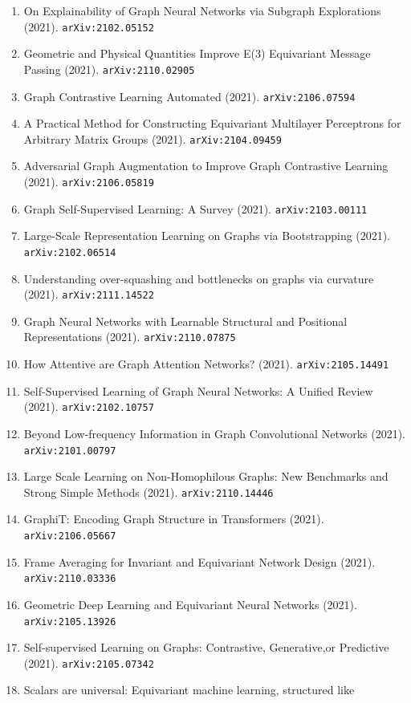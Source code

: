 \documentclass[11pt]{article}
\begin{document}
\begin{enumerate}
  \item On Explainability of Graph Neural Networks via Subgraph Explorations (2021). \texttt{arXiv:2102.05152}
  \item Geometric and Physical Quantities Improve E(3) Equivariant Message
  Passing (2021). \texttt{arXiv:2110.02905}
  \item Graph Contrastive Learning Automated (2021). \texttt{arXiv:2106.07594}
  \item A Practical Method for Constructing Equivariant Multilayer Perceptrons
  for Arbitrary Matrix Groups (2021). \texttt{arXiv:2104.09459}
  \item Adversarial Graph Augmentation to Improve Graph Contrastive Learning (2021). \texttt{arXiv:2106.05819}
  \item Graph Self-Supervised Learning: A Survey (2021). \texttt{arXiv:2103.00111}
  \item Large-Scale Representation Learning on Graphs via Bootstrapping (2021). \texttt{arXiv:2102.06514}
  \item Understanding over-squashing and bottlenecks on graphs via curvature (2021). \texttt{arXiv:2111.14522}
  \item Graph Neural Networks with Learnable Structural and Positional
  Representations (2021). \texttt{arXiv:2110.07875}
  \item How Attentive are Graph Attention Networks? (2021). \texttt{arXiv:2105.14491}
  \item Self-Supervised Learning of Graph Neural Networks: A Unified Review (2021). \texttt{arXiv:2102.10757}
  \item Beyond Low-frequency Information in Graph Convolutional Networks (2021). \texttt{arXiv:2101.00797}
  \item Large Scale Learning on Non-Homophilous Graphs: New Benchmarks and
  Strong Simple Methods (2021). \texttt{arXiv:2110.14446}
  \item GraphiT: Encoding Graph Structure in Transformers (2021). \texttt{arXiv:2106.05667}
  \item Frame Averaging for Invariant and Equivariant Network Design (2021). \texttt{arXiv:2110.03336}
  \item Geometric Deep Learning and Equivariant Neural Networks (2021). \texttt{arXiv:2105.13926}
  \item Self-supervised Learning on Graphs: Contrastive, Generative,or
  Predictive (2021). \texttt{arXiv:2105.07342}
  \item Scalars are universal: Equivariant machine learning, structured like

\end{enumerate}
\end{document}
